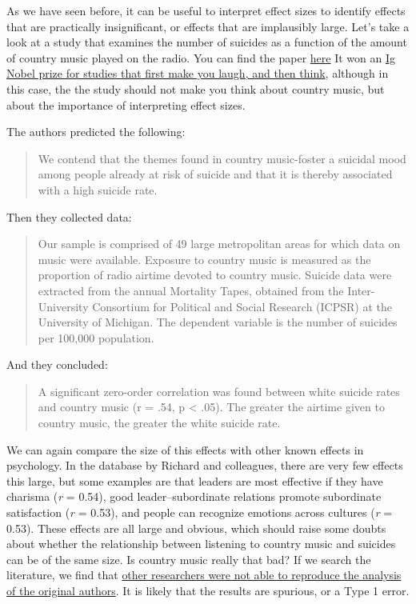\documentclass[
  oneside]{book}
\begin{document}
As we have seen before, it can be useful to interpret effect sizes to identify effects that are practically insignificant, or effects that are implausibly large. Let's take a look at a study that examines the number of suicides as a function of the amount of country music played on the radio. You can find the paper \href{https://heinonline.org/HOL/P?h=hein.journals/josf71\&i=227}{here} It won an \href{http://www.abc.net.au/science/articles/2004/10/01/1211441.htm}{Ig Nobel prize for studies that first make you laugh, and then think}, although in this case, the the study should not make you think about country music, but about the importance of interpreting effect sizes.

The authors predicted the following:

\begin{quote}
We contend that the themes found in country music-foster a suicidal mood among people already at risk of suicide and that it is thereby associated with a high suicide rate.
\end{quote}

Then they collected data:

\begin{quote}
Our sample is comprised of 49 large metropolitan areas for which data on music were available. Exposure to country music is measured as the proportion of radio airtime devoted to country music. Suicide data were extracted from the annual Mortality Tapes, obtained from the Inter-University Consortium for Political and Social Research (ICPSR) at the University of Michigan. The dependent variable is the number of suicides per 100,000 population.
\end{quote}

And they concluded:

\begin{quote}
A significant zero-order correlation was found between white suicide rates and country music (r = .54, p \textless{} .05). The greater the airtime given to country music, the greater the white suicide rate.
\end{quote}

We can again compare the size of this effects with other known effects in psychology. In the database by Richard and colleagues, there are very few effects this large, but some examples are that leaders are most effective if they have charisma (\emph{r} = 0.54), good leader--subordinate relations promote subordinate satisfaction (\emph{r} = 0.53), and people can recognize emotions across cultures (\emph{r} = 0.53). These effects are all large and obvious, which should raise some doubts about whether the relationship between listening to country music and suicides can be of the same size. Is country music really that bad? If we search the literature, we find that \href{http://sf.oxfordjournals.org/content/74/1/327.short}{other researchers were not able to reproduce the analysis of the original authors}. It is likely that the results are spurious, or a Type 1 error.
\end{document}
